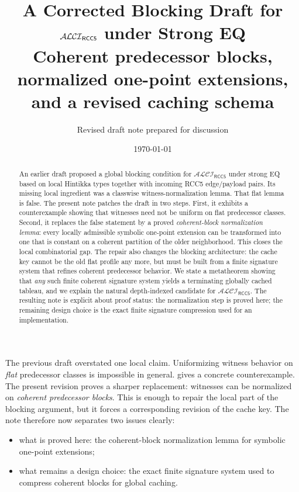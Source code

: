 \documentclass[11pt]{article}
\title{A Corrected Blocking Draft for \texorpdfstring{$\ALCIRCCFive$}{ALCI RCC5} under Strong EQ\\[0.4em]
\large Coherent predecessor blocks, normalized one-point extensions, and a revised caching schema}
\author{Revised draft note prepared for discussion}
\date{\today}
\theoremstyle{definition}
\newcommand{\ALCIRCCFive}{\mathcal{ALCI}_{\mathsf{RCC5}}}
\begin{document}
\maketitle

\begin{abstract}
An earlier draft proposed a global blocking condition for $\ALCIRCCFive$ under strong EQ based on local Hintikka types together with incoming RCC5 edge/payload pairs. Its missing local ingredient was a classwise witness-normalization lemma. That flat lemma is false. The present note patches the draft in two steps. First, it exhibits a counterexample showing that witnesses need not be uniform on flat predecessor classes. Second, it replaces the false statement by a proved \emph{coherent-block normalization lemma}: every locally admissible symbolic one-point extension can be transformed into one that is constant on a coherent partition of the older neighborhood. This closes the local combinatorial gap. The repair also changes the blocking architecture: the cache key cannot be the old flat profile any more, but must be built from a finite signature system that refines coherent predecessor behavior. We state a metatheorem showing that \emph{any} such finite coherent signature system yields a terminating globally cached tableau, and we explain the natural depth-indexed candidate for $\ALCIRCCFive$. The resulting note is explicit about proof status: the normalization step is proved here; the remaining design choice is the exact finite signature compression used for an implementation.
\end{abstract}

\begin{tcolorbox}[colback=blue!3,colframe=blue!35!black,title=What is corrected in this revision?]
The previous draft overstated one local claim. Uniformizing witness behavior on \emph{flat} predecessor classes is impossible in general.  gives a concrete counterexample. The present revision proves a sharper replacement: witnesses can be normalized on \emph{coherent predecessor blocks}. This is enough to repair the local part of the blocking argument, but it forces a corresponding revision of the cache key. The note therefore now separates two issues clearly:
\begin{itemize}
  \item what is proved here: the coherent-block normalization lemma for symbolic one-point extensions;
  \item what remains a design choice: the exact finite signature system used to compress coherent blocks for global caching.
\end{itemize}
\end{tcolorbox}
\end{document}
